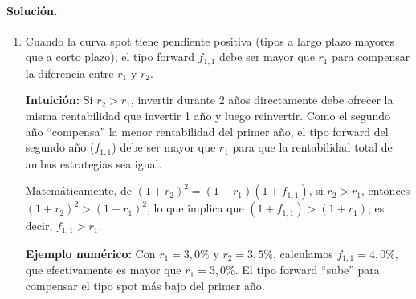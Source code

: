 \documentclass[12pt,a4paper]{article}
\newenvironment{solucion}{\paragraph{Solución.}}{}
\begin{document}
\begin{solucion}
\begin{enumerate}[label=\alph*)]
   \item Cuando la curva spot tiene pendiente positiva (tipos a largo plazo mayores que a corto plazo), el tipo forward \(f_{1,1}\) debe ser mayor que \(r_1\) para compensar la diferencia entre \(r_1\) y \(r_2\).
   
   \textbf{Intuición:} Si \(r_2 > r_1\), invertir durante 2 años directamente debe ofrecer la misma rentabilidad que invertir 1 año y luego reinvertir. Como el segundo año ``compensa'' la menor rentabilidad del primer año, el tipo forward del segundo año (\(f_{1,1}\)) debe ser mayor que \(r_1\) para que la rentabilidad total de ambas estrategias sea igual.
   
   Matemáticamente, de \((1+r_2)^2 = (1+r_1)(1+f_{1,1})\), si \(r_2 > r_1\), entonces \((1+r_2)^2 > (1+r_1)^2\), lo que implica que \((1+f_{1,1}) > (1+r_1)\), es decir, \(f_{1,1} > r_1\).
   
   \textbf{Ejemplo numérico:} Con \(r_1 = 3{,}0\%\) y \(r_2 = 3{,}5\%\), calculamos \(f_{1,1} = 4{,}0\%\), que efectivamente es mayor que \(r_1 = 3{,}0\%\). El tipo forward ``sube'' para compensar el tipo spot más bajo del primer año.
 \end{enumerate}
 \end{solucion}
\end{document}
